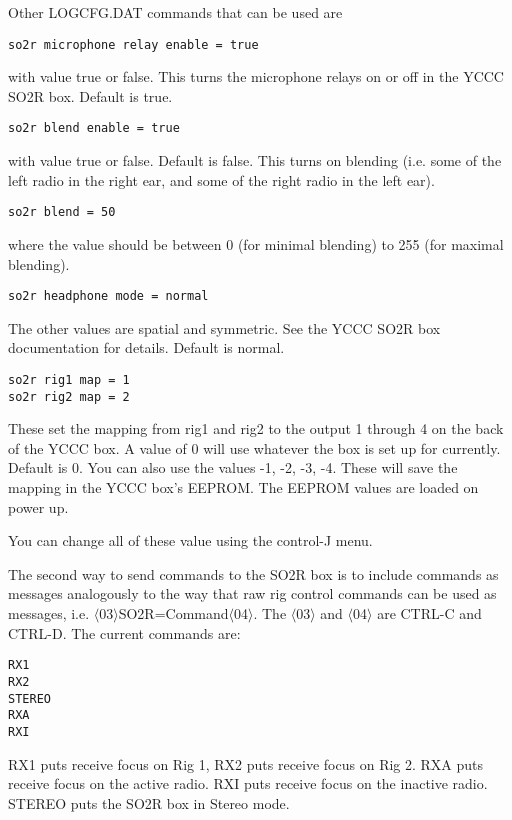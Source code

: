 \documentclass[12pt]{article}
\begin{document}
Other LOGCFG.DAT commands that can be used
are
\begin{verbatim}
so2r microphone relay enable = true
\end{verbatim}
with value true or false. This turns the microphone relays on or off
in the YCCC SO2R box. Default is true.

\begin{verbatim}
so2r blend enable = true
\end{verbatim}
with
value true or false. Default is false. This turns on blending (i.e.
some of the left radio in the right ear, and some of the right radio
in the left ear).

\begin{verbatim}
so2r blend = 50
\end{verbatim}
where
the value should be between 0 (for minimal blending) to 255
(for maximal blending).

\begin{verbatim}
so2r headphone mode = normal
\end{verbatim}
The other values are spatial and symmetric. See the YCCC SO2R box documentation
for details. Default is normal.

\begin{verbatim}
so2r rig1 map = 1
so2r rig2 map = 2
\end{verbatim}

These set the mapping from rig1 and rig2 to the output 1 through 4 on
the back of the YCCC box. A value of 0 will use whatever the box is
set up for currently. Default is 0.
You can also use the values -1, -2, -3, -4. These will save the mapping
in the YCCC box's EEPROM. The EEPROM values are loaded on power up.

You can change all of these value using the control-J menu.

The second way to send commands to the SO2R box is to
include commands as messages analogously to the way that
raw rig control commands can be used as messages, i.e.
$\langle$03$\rangle$SO2R=Command$\langle$04$\rangle$.
The $\langle$03$\rangle$ and $\langle$04$\rangle$  are CTRL-C and CTRL-D.
The current commands are:
\begin{verbatim}
RX1
RX2
STEREO
RXA
RXI
\end{verbatim}
RX1
puts receive focus on Rig 1, RX2 puts receive focus on Rig 2.
RXA puts receive focus on the active radio.
RXI puts receive focus on the inactive radio.
STEREO puts the SO2R box in Stereo mode. 
\end{document}
